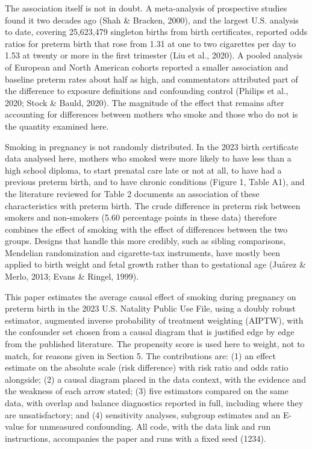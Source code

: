 \documentclass[11pt,letterpaper]{article}
\begin{document}
The association itself is not in doubt. A meta-analysis of prospective studies found it two decades ago (Shah \& Bracken, 2000), and the largest U.S. analysis to date, covering 25,623,479 singleton births from birth certificates, reported odds ratios for preterm birth that rose from 1.31 at one to two cigarettes per day to 1.53 at twenty or more in the first trimester (Liu et al., 2020). A pooled analysis of European and North American cohorts reported a smaller association and baseline preterm rates about half as high, and commentators attributed part of the difference to exposure definitions and confounding control (Philips et al., 2020; Stock \& Bauld, 2020). The magnitude of the effect that remains after accounting for differences between mothers who smoke and those who do not is the quantity examined here.

Smoking in pregnancy is not randomly distributed. In the 2023 birth certificate data analysed here, mothers who smoked were more likely to have less than a high school diploma, to start prenatal care late or not at all, to have had a previous preterm birth, and to have chronic conditions (Figure 1, Table A1), and the literature reviewed for Table 2 documents an association of these characteristics with preterm birth. The crude difference in preterm risk between smokers and non-smokers (5.60 percentage points in these data) therefore combines the effect of smoking with the effect of differences between the two groups. Designs that handle this more credibly, such as sibling comparisons, Mendelian randomization and cigarette-tax instruments, have mostly been applied to birth weight and fetal growth rather than to gestational age (Juárez \& Merlo, 2013; Evans \& Ringel, 1999).

This paper estimates the average causal effect of smoking during pregnancy on preterm birth in the 2023 U.S. Natality Public Use File, using a doubly robust estimator, augmented inverse probability of treatment weighting (AIPTW), with the confounder set chosen from a causal diagram that is justified edge by edge from the published literature. The propensity score is used here to weight, not to match, for reasons given in Section 5. The contributions are: (1) an effect estimate on the absolute scale (risk difference) with risk ratio and odds ratio alongside; (2) a causal diagram placed in the data context, with the evidence and the weakness of each arrow stated; (3) five estimators compared on the same data, with overlap and balance diagnostics reported in full, including where they are unsatisfactory; and (4) sensitivity analyses, subgroup estimates and an E-value for unmeasured confounding. All code, with the data link and run instructions, accompanies the paper and runs with a fixed seed (1234).
\end{document}
